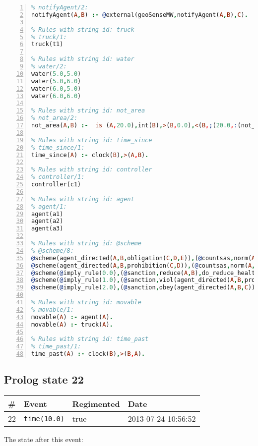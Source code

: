\documentclass[11pt]{article}\usepackage[utf8]{inputenc}\usepackage{geometry}
\begin{document}
\begin{lstlisting}[language=Prolog, numbers=left]
% Rules with string id: notifyAgent
% notifyAgent/2:
notifyAgent(A,B) :- @external(geoSenseMW,notifyAgent(A,B),C).

% Rules with string id: truck
% truck/1:
truck(t1)

% Rules with string id: water
% water/2:
water(5.0,5.0)
water(5.0,6.0)
water(6.0,5.0)
water(6.0,6.0)

% Rules with string id: not_area
% not_area/2:
not_area(A,B) :-  is (A,20.0),int(B),>(B,0.0),<(B,;(20.0,:(not_area(A,B), is (-(B),20.0)))),int(A),>(A,0.0),<(A,;(20.0,:(area(A,B),-(int(A))))),int(B),>(A,0.0),>(B,0.0),<(A,21.0),<(B,21.0).

% Rules with string id: time_since
% time_since/1:
time_since(A) :- clock(B),>(A,B).

% Rules with string id: controller
% controller/1:
controller(c1)

% Rules with string id: agent
% agent/1:
agent(a1)
agent(a2)
agent(a3)

% Rules with string id: @scheme
% @scheme/8:
@scheme(agent_directed(A,B,obligation(C,D,E)),(@countsas,norm(A,B,F,obligation(C,D,E)),F),false,(listTrue(C)),(time_past(D)),false,[plus(viol(agent_directed(A,B,obligation(C,D,E))))|[]],[plus(obey(agent_directed(A,B,obligation(C,D,E))))|[]])
@scheme(agent_directed(A,B,prohibition(C,D)),(@countsas,norm(A,B,E,prohibition(C,D)),E),(listTrue(C)),false,(false),false,[plus(viol(agent_directed(A,B,prohibition(C,D))))|[]],[plus(obey(agent_directed(A,B,prohibition(C,D))))|[]])
@scheme(@imply_rule(0.0),(@sanction,reduce(A,B),do_reduce_health(A,B),notifyAgent(A,changed(status))),true,false,false,false,[min(reduce(A,B))|[]],[])
@scheme(@imply_rule(1.0),(@sanction,viol(agent_directed(A,B,prohibition(C,D))),do_sanction(D)),true,false,false,false,[min(viol(agent_directed(A,B,prohibition(C,D))))|[]],[])
@scheme(@imply_rule(2.0),(@sanction,obey(agent_directed(A,B,C))),true,false,false,false,[min(obey(agent_directed(A,B,C)))|[]],[])

% Rules with string id: movable
% movable/1:
movable(A) :- agent(A).
movable(A) :- truck(A).

% Rules with string id: time_past
% time_past/1:
time_past(A) :- clock(B),>(B,A).

\end{lstlisting}
\clearpage 
\subsection{Prolog state 22}
\begin{table}[ht]
\centering 
\begin{tabular}{l l l l} 
\textbf{\#} & \textbf{Event} & \textbf{Regimented} & \textbf{Date} \\ [0.5ex] 
\hline
22&\texttt{time(10.0)}&true&2013-07-24 10:56:52\\ [1ex] \hline\end{tabular}
\end{table}
The state after this event:
\end{document}
